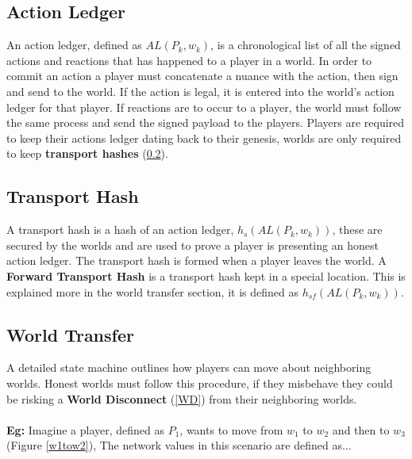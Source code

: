 \documentclass[runningheads,a4paper]{llncs}
\begin{document}
\subsection{Action Ledger}
\label{AL}
An action ledger, defined as $AL(P_{k}, w_k)$, is a chronological list of all the signed actions and reactions that has happened to a player in a world. In order to commit an action a player must concatenate a nuance with the action, then sign and send to the world. If the action is legal, it is entered into the world's action ledger for that player. If reactions are to occur to a player, the world must follow the same process and send the signed payload to the players. Players are required to keep their actions ledger dating back to their genesis, worlds are only required to keep \textbf{transport hashes} (\ref{TH}).

\subsection{Transport Hash}
\label{TH}
A transport hash is a hash of an action ledger, $h_s(AL(P_{k}, w_k))$, these are secured by the worlds and are used to prove a player is presenting an honest action ledger. The transport hash is formed when a player leaves the world. A \textbf{Forward Transport Hash} is a transport hash kept in a special location. This is explained more in the world transfer section, it is defined as  $h_{sf}(AL(P_{k}, w_k))$.

\subsection{World Transfer} 
\label{WT}
A detailed state machine outlines how players can move about neighboring worlds. Honest worlds must follow this procedure, if they misbehave they could be risking a \textbf{World Disconnect} (\ref{WD}) from their neighboring worlds. 
\\
\\
\textbf{Eg:} Imagine a player, defined as $P_1$, wants to move from $w_1$ to $w_2$ and then to $w_3$ (Figure \ref{w1tow2}), The network values in this scenario are defined as...
\end{document}
